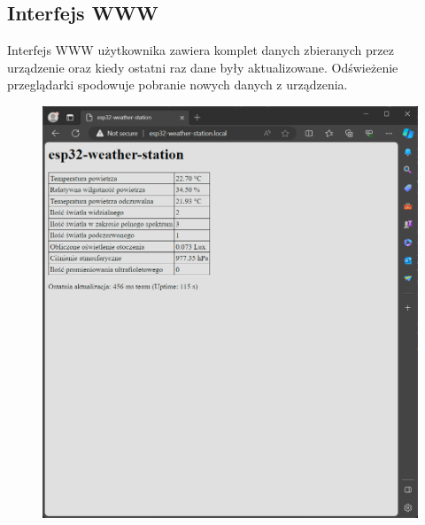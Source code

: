 \documentclass[12pt,a4paper]{article}
\begin{document}
\subsection{Interfejs WWW}
Interfejs WWW użytkownika zawiera komplet danych zbieranych przez urządzenie oraz kiedy ostatni raz dane były aktualizowane. 
Odświeżenie przeglądarki spodowuje pobranie nowych danych z urządzenia.
\begin{figure}[H]
    \centering
    \includegraphics[width=\textwidth]{web-interface.png}
\end{figure}
\end{document}
